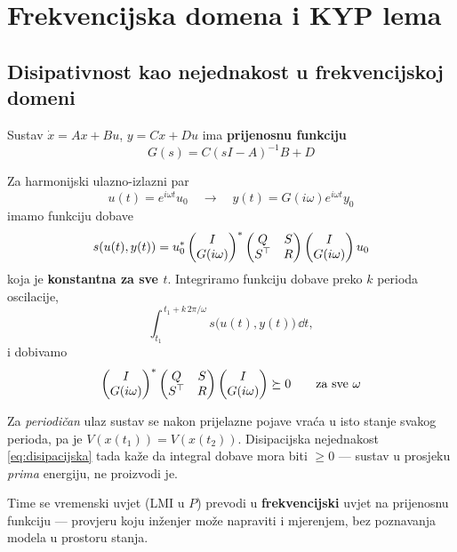 \section{Frekvencijska domena i KYP lema}

\subsection{Disipativnost kao nejednakost u frekvencijskoj domeni}

Sustav $\dot x = Ax + Bu$, $y = Cx + Du$ ima \textbf{prijenosnu funkciju}
\[
G(s) = C(sI - A)^{-1}B + D
\]

Za harmonijski ulazno-izlazni par
\[
u(t) = e^{i\omega t}u_0 \quad\to\quad y(t) = G(i\omega)e^{i\omega t}y_0
\]
imamo funkciju dobave
\[
s(u(t),y(t)) = u_0^{*}
\begin{pmatrix}I\\ G(i\omega)\end{pmatrix}^{*}
\begin{pmatrix}Q & S\\ S^{\top} & R\end{pmatrix}
\begin{pmatrix}I\\ G(i\omega)\end{pmatrix} u_0
\]
koja je \textbf{konstantna za sve $t$}. Integriramo funkciju dobave preko
$k$ perioda oscilacije,
\[
\int_{t_1}^{\,t_1 + k\,2\pi/\omega} s\big(u(t),y(t)\big)\,\dd t ,
\]
i dobivamo
\begin{equation}
\label{eq:frekvencijska}
\begin{pmatrix}I\\ G(i\omega)\end{pmatrix}^{*}
\begin{pmatrix}Q & S\\ S^{\top} & R\end{pmatrix}
\begin{pmatrix}I\\ G(i\omega)\end{pmatrix} \succeq 0
\qquad\text{za sve } \omega
\end{equation}

\begin{napomena}
Za \emph{periodičan} ulaz sustav se nakon prijelazne pojave vraća u isto stanje
svakog perioda, pa je $V(x(t_1)) = V(x(t_2))$. Disipacijska nejednakost
\eqref{eq:disipacijska} tada kaže da integral dobave mora biti $\ge 0$ ---
sustav u prosjeku \emph{prima} energiju, ne proizvodi je.

Time se vremenski uvjet (LMI u $P$) prevodi u \textbf{frekvencijski} uvjet na
prijenosnu funkciju --- provjeru koju inženjer može napraviti i mjerenjem, bez
poznavanja modela u prostoru stanja.
\end{napomena}

